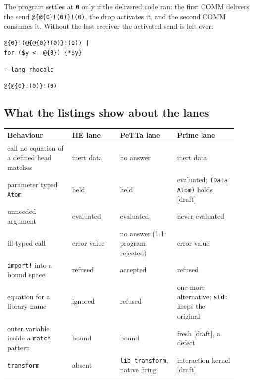 \documentclass[11pt]{article}
\newcommand{\code}[1]{\texttt{#1}}
\newcommand{\outhead}[1]{{\footnotesize\sffamily #1}\par\vspace{1pt}}
\newcommand{\kind}[1]{\textsf{\small[#1]}}
\newcommand{\PeTTa}{\textup{PeTTa}}
\newcommand{\HE}{\textup{HE}}
\begin{document}
\noindent
The program settles at \code{0} only if the delivered code ran: the first COMM
delivers the send \code{@\{@\{0\}!(0)\}!(0)}, the drop activates it, and the
second COMM consumes it.  Without the last receiver the activated send is
left over:

\begin{lstlisting}[style=metta,caption={The same program without the last receiver},label={lst:t10c}]
@{0}!(@{@{0}!(0)}!(0)) |
for ($y <- @{0}) {*$y}
\end{lstlisting}
\noindent\begin{minipage}[t]{0.98\textwidth}
\outhead{\code{-{}-lang rhocalc}}
\begin{lstlisting}[style=out]
@{@{0}!(0)}!(0)
\end{lstlisting}
\end{minipage}

\subsection{What the listings show about the lanes}
\label{sec:tut-summary}

\begin{center}
\small
\begin{tabular}{@{}p{0.27\linewidth}p{0.20\linewidth}p{0.20\linewidth}p{0.25\linewidth}@{}}
\toprule
Behaviour & \HE{} lane & \PeTTa{} lane & Prime lane \\
\midrule
call no equation of a defined head matches & inert data & no answer & inert data \\
parameter typed \code{Atom} & held & held & evaluated; \code{(Data Atom)} holds \kind{draft} \\
unneeded argument & evaluated & evaluated & never evaluated \\
ill-typed call & error value & no answer (1.1: program rejected) & error value \\
\code{import!} into a bound space & refused & accepted & refused \\
equation for a library name & ignored & refused & one more alternative; \code{std:} keeps the original \\
outer variable inside a \code{match} pattern & bound & bound & fresh \kind{draft}, a defect \\
\code{transform} & absent & \code{lib\_transform}, native firing & interaction kernel \kind{draft} \\
\bottomrule
\end{tabular}
\end{center}
\end{document}
